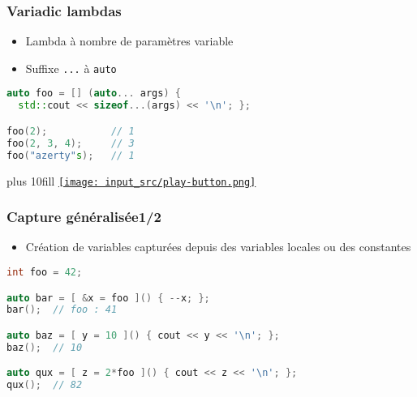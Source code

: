 \documentclass[C++.tex]{subfiles}
\begin{document}
\begin{frame}[fragile]
	\frametitle{Variadic lambdas}
	\begin{itemize}
		\item Lambda à nombre de paramètres variable
		\item Suffixe \lstinline|...| à \lstinline|auto|
	\end{itemize}

	\begin{lstlisting}[language=C++]
auto foo = [] (auto... args) { 
  std::cout << sizeof...(args) << '\n'; };

foo(2);           // 1
foo(2, 3, 4);     // 3
foo("azerty"s);   // 1\end{lstlisting}

	\vskip 10mm plus 10fill
	\hfill
	\href{https://godbolt.org/#g:!((g:!((g:!((h:codeEditor,i:(filename:'1',fontScale:14,fontUsePx:'0',j:1,lang:c%2B%2B,selection:(endColumn:1,endLineNumber:13,positionColumn:1,positionLineNumber:13,selectionStartColumn:1,selectionStartLineNumber:13,startColumn:1,startLineNumber:13),source:'%23include+%3Ciostream%3E%0A%23include+%3Cstring%3E%0A%0Ausing+namespace+std::literals%3B%0A%0Aint+main()%0A%7B%0A++auto+foo+%3D+%5B%5D+(auto...+args)+%7B+std::cout+%3C%3C+sizeof...(args)+%3C%3C+!'%5Cn!'%3B+%7D%3B%0A%0A++foo(2)%3B%0A++foo(2,+3,+4)%3B%0A++foo(%22azerty%22s)%3B%0A%7D%0A'),l:'5',n:'0',o:'C%2B%2B+source+%231',t:'0')),k:50,l:'4',n:'0',o:'',s:0,t:'0'),(g:!((h:executor,i:(argsPanelShown:'1',compilationPanelShown:'0',compiler:g112,compilerOutShown:'0',execArgs:'',execStdin:'',fontScale:14,fontUsePx:'0',j:1,lang:c%2B%2B,libs:!((name:boost,ver:'175')),options:'-std%3Dc%2B%2B14',source:1,stdinPanelShown:'1',tree:'1',wrap:'0'),l:'5',n:'0',o:'Executor+x86-64+gcc+11.2+(C%2B%2B,+Editor+%231)',t:'0')),header:(),k:50,l:'4',n:'0',o:'',s:0,t:'0')),l:'2',n:'0',o:'',t:'0')),version:4}{\texttt{[image: input\_src/play-button.png]}}
\end{frame}

\begin{frame}[fragile]
	\frametitle{Capture généralisée\titlehfill{}1/2}
	\begin{itemize}
		\item Création de variables capturées depuis des variables locales ou des constantes
	\end{itemize}

	\begin{lstlisting}[language=C++]
int foo = 42;

auto bar = [ &x = foo ]() { --x; };
bar();  // foo : 41

auto baz = [ y = 10 ]() { cout << y << '\n'; };
baz();  // 10

auto qux = [ z = 2*foo ]() { cout << z << '\n'; };
qux();  // 82\end{lstlisting}
\end{frame}
\end{document}
